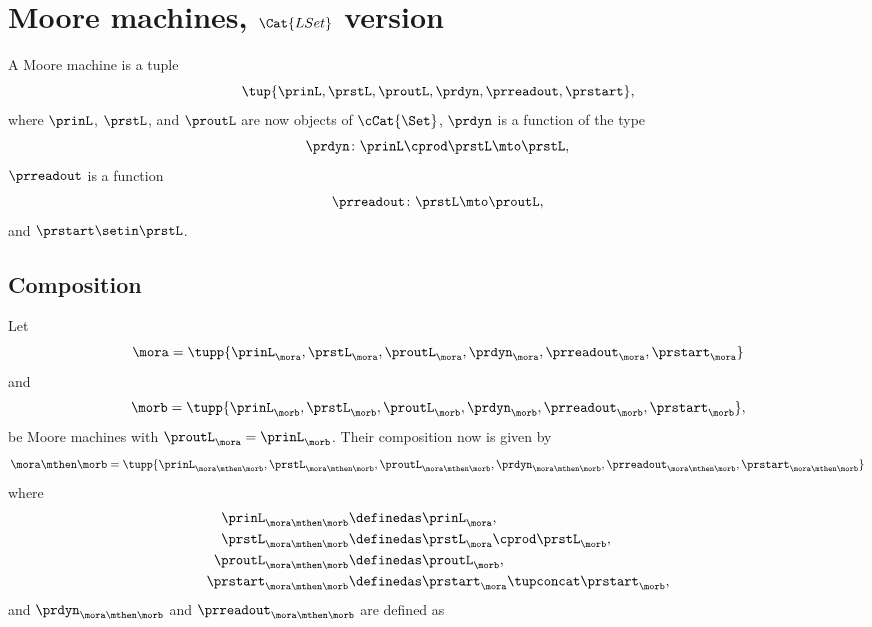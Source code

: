 
\section{Moore machines, $\Cat{LSet}$ version}

\begin{definition}
    \label{def:moore_machine_3rd}
    A Moore machine is a tuple
    \begin{equation}
        \label{eq:moore-tuple-improved-again}
        \tup{\prinL,\prstL,\proutL,\prdyn,\prreadout,\prstart},
    \end{equation}
    where $\prinL$, $\prstL$, and $\proutL$ are now objects of $\cCat{\Set}$, $\prdyn$ is a function of the type
    \begin{equation}
        \prdyn \colon \prinL \cprod \prstL \mto \prstL,
    \end{equation}
    $\prreadout$ is a function
    \begin{equation}
        \prreadout \colon \prstL \mto \proutL,
    \end{equation}
    and $\prstart \setin \prstL$.
\end{definition}

\subsection{Composition}

Let
\begin{equation}
    \label{eq:moore-mora-3rd}
    \mora = \tupp{\prinL_{\mora},\prstL_{\mora},\proutL_{\mora},\prdyn_{\mora},\prreadout_{\mora},\prstart_{\mora}}
\end{equation}
%
and
%
\begin{equation}
    \label{eq:moore-morb-3rd}
    \morb = \tupp{\prinL_{\morb},\prstL_{\morb},\proutL_{\morb},\prdyn_{\morb},\prreadout_{\morb},\prstart_{\morb}},
\end{equation}
be Moore machines with $\proutL_{\mora} = \prinL_{\morb}$.
Their composition now is given by
\begin{equation}
    \mora \mthen \morb = \tupp{\prinL_{\mora \mthen \morb},\prstL_{\mora \mthen \morb},\proutL_{\mora \mthen \morb},\prdyn_{\mora \mthen \morb},\prreadout_{\mora \mthen \morb},\prstart_{\mora \mthen \morb}}
\end{equation}
where
%
\begin{equation}
    \label{eq:moore-comp-3rd-1}
    \begin{aligned}
        \prinL_{\mora\mthen\morb}   & \definedas \prinL_{\mora}, \\
        \prstL_{\mora\mthen\morb}   & \definedas \prstL_{\mora} \cprod  \prstL_{\morb}, \\
        \proutL_{\mora\mthen\morb}  & \definedas \proutL_{\morb}, \\
        \prstart_{\mora\mthen\morb} & \definedas \prstart_{\mora} \tupconcat \prstart_{\morb},
    \end{aligned}
\end{equation}
and $\prdyn_{\mora \mthen \morb}$ and $\prreadout_{\mora \mthen \morb}$ are defined as

